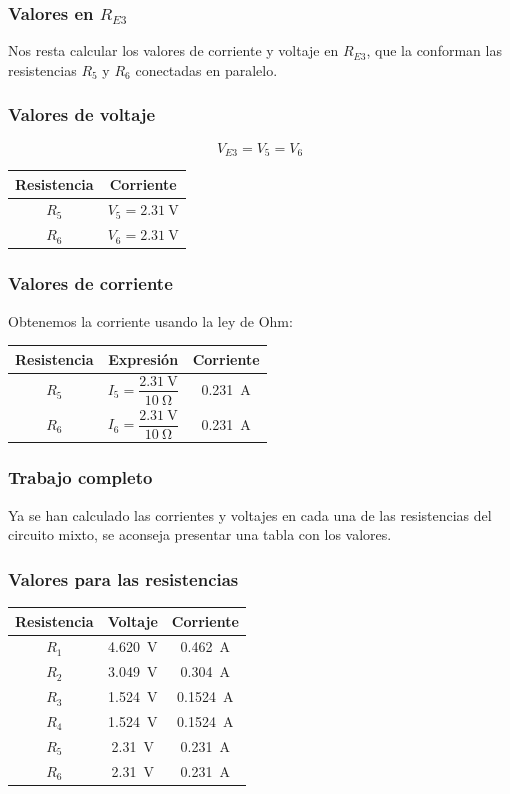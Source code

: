 \documentclass[14pt]{beamer}
\begin{document}
\begin{frame}
\frametitle{Valores en $R_{E3}$}
Nos resta calcular los valores de corriente y voltaje en $R_{E3}$, que la conforman las resistencias $R_{5}$ y $R_{6}$ conectadas en paralelo.
\end{frame}
\begin{frame}
\frametitle{Valores de voltaje}
\vspace*{-1cm}
\[ V_{E3} = V_{5} = V_{6} \]
\begin{table}[H]
\centering
\begin{tabular}{c | c }
Resistencia & Corriente \\ \hline
$R_{5}$ & $V_{5} = \SI{2.31}{\volt}$ \\ \hline
$R_{6}$ & $V_{6} = \SI{2.31}{\volt}$ \\ \hline
\end{tabular}
\end{table}    
\end{frame}
\begin{frame}
\frametitle{Valores de corriente}
Obtenemos la corriente usando la ley de Ohm:
\begin{table}[H]
\centering
\begin{tabular}{c | c | c}
Resistencia & Expresión & Corriente \\ \hline
$R_{5}$ & $I_{5} = \dfrac{\SI{2.31}{\volt}}{\SI{10}{\ohm}}$ & \SI{0.231}{\ampere} \\ \hline
$R_{6}$ & $I_{6} = \dfrac{\SI{2.31}{\volt}}{\SI{10}{\ohm}}$ & \SI{0.231}{\ampere} \\ \hline
\end{tabular}
\end{table}    
\end{frame}
\begin{frame}
\frametitle{Trabajo completo}
Ya se han calculado las corrientes y voltajes en cada una de las resistencias del circuito mixto, se aconseja presentar una tabla con los valores.
\end{frame}
\begin{frame}
\frametitle{Valores para las resistencias}
\begin{table}[H]
\centering
\renewcommand{\arraystretch}{0.8}
\begin{tabular}{| c | c | c |} \hline
Resistencia & Voltaje & Corriente \\ \hline
$R_{1}$ & \SI{4.620}{\volt} & \SI{0.462}{\ampere} \\ \hline
$R_{2}$ & \SI{3.049}{\volt} & \SI{0.304}{\ampere} \\ \hline
$R_{3}$ & \SI{1.524}{\volt} & \SI{0.1524}{\ampere} \\ \hline
$R_{4}$ & \SI{1.524}{\volt} & \SI{0.1524}{\ampere} \\ \hline
$R_{5}$ & \SI{2.31}{\volt} & \SI{0.231}{\ampere} \\ \hline
$R_{6}$ & \SI{2.31}{\volt} & \SI{0.231}{\ampere} \\ \hline
\end{tabular}
\end{table}
\end{frame}
\end{document}
